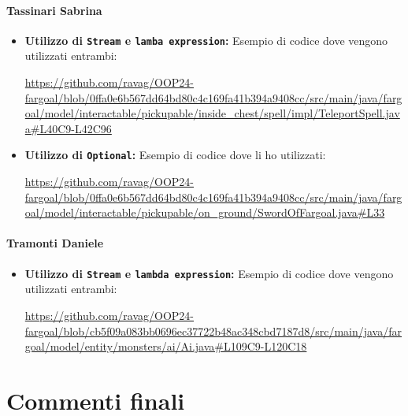 \documentclass{report}
\begin{document}
\subsubsection{Tassinari Sabrina}
\begin{itemize}
    \item \textbf{Utilizzo di \texttt{Stream} e \texttt{lamba expression}:} \newline
    Esempio di codice dove vengono utilizzati entrambi:
    \begin{sloppypar}
        \url{https://github.com/ravag/OOP24-fargoal/blob/0ffa0e6b567dd64bd80c4c169fa41b394a9408cc/src/main/java/fargoal/model/interactable/pickupable/inside_chest/spell/impl/TeleportSpell.java#L40C9-L42C96}
    \end{sloppypar}
    \item \textbf{Utilizzo di \texttt{Optional}:}\newline
    Esempio di codice dove li ho utilizzati:
    \begin{sloppypar}
        \url{https://github.com/ravag/OOP24-fargoal/blob/0ffa0e6b567dd64bd80c4c169fa41b394a9408cc/src/main/java/fargoal/model/interactable/pickupable/on_ground/SwordOfFargoal.java#L33}
    \end{sloppypar}
\end{itemize}

\subsubsection{Tramonti Daniele}
\begin{itemize}
    \item \textbf{Utilizzo di \texttt{Stream} e \texttt{lambda expression}:}\newline
    Esempio di codice dove vengono utilizzati entrambi:
    \begin{sloppypar}
        \url{https://github.com/ravag/OOP24-fargoal/blob/cb5f09a083bb0696ec37722b48ac348cbd7187d8/src/main/java/fargoal/model/entity/monsters/ai/Ai.java#L109C9-L120C18}
    \end{sloppypar}
\end{itemize}
\paragraph{}

\chapter{Commenti finali}
\end{document}
